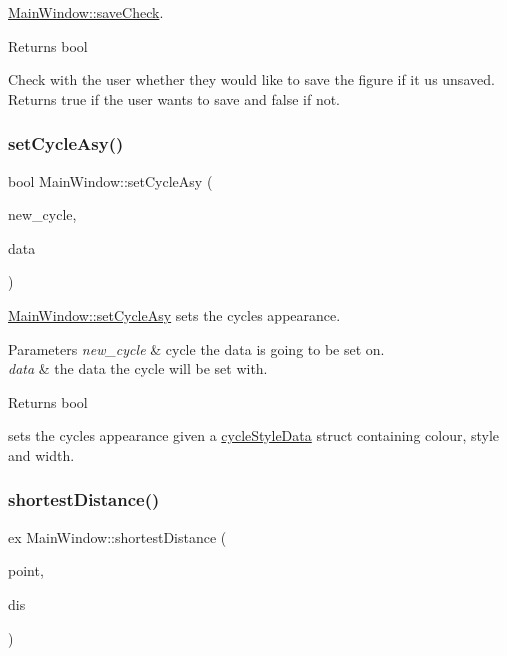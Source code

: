 \mbox{\hyperlink{class_main_window_ae2defb68c51e884b7031693b20bdd556}{Main\+Window\+::save\+Check}}. 

\begin{DoxyReturn}{Returns}
bool
\end{DoxyReturn}
Check with the user whether they would like to save the figure if it us unsaved. Returns true if the user wants to save and false if not. \mbox{\label{class_main_window_a633c8594fbb906b2e914a4b3bbf50d97}} 
\subsubsection{\texorpdfstring{set\+Cycle\+Asy()}{setCycleAsy()}}
{\footnotesize\ttfamily bool Main\+Window\+::set\+Cycle\+Asy (\begin{DoxyParamCaption}\item[{const Gi\+Na\+C\+::ex \&}]{new\+\_\+cycle,  }\item[{const struct \mbox{\hyperlink{structcycle_style_data}{cycle\+Style\+Data}} \&}]{data }\end{DoxyParamCaption})}



\mbox{\hyperlink{class_main_window_a633c8594fbb906b2e914a4b3bbf50d97}{Main\+Window\+::set\+Cycle\+Asy}} sets the cycles appearance. 


\begin{DoxyParams}{Parameters}
{\em new\+\_\+cycle} & cycle the data is going to be set on. \\
\hline
{\em data} & the data the cycle will be set with. \\
\hline
\end{DoxyParams}
\begin{DoxyReturn}{Returns}
bool
\end{DoxyReturn}
sets the cycles appearance given a \mbox{\hyperlink{structcycle_style_data}{cycle\+Style\+Data}} struct containing colour, style and width. \mbox{\label{class_main_window_a2431b3144405d8d0d3e8bd3523ad381b}} 
\subsubsection{\texorpdfstring{shortest\+Distance()}{shortestDistance()}}
{\footnotesize\ttfamily ex Main\+Window\+::shortest\+Distance (\begin{DoxyParamCaption}\item[{Q\+PointF}]{point,  }\item[{double}]{dis }\end{DoxyParamCaption})}



